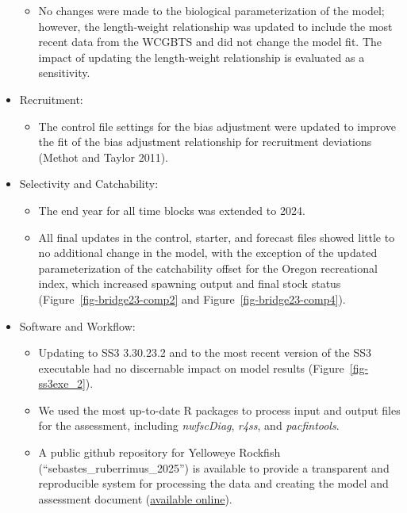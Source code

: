 \documentclass[
]{scrartcl}
\providecommand{\tightlist}{%
  \setlength{\itemsep}{0pt}\setlength{\parskip}{0pt}}\usepackage{longtable,booktabs,array}
\begin{document}
\begin{itemize}
  \begin{itemize}
  \tightlist
  \item
    No changes were made to the biological parameterization of the
    model; however, the length-weight relationship was updated to
    include the most recent data from the WCGBTS and did not change the
    model fit. The impact of updating the length-weight relationship is
    evaluated as a sensitivity.
  \end{itemize}
\item
  Recruitment:

  \begin{itemize}
  \tightlist
  \item
    The control file settings for the bias adjustment were updated to
    improve the fit of the bias adjustment relationship for recruitment
    deviations (Methot and Taylor 2011).
  \end{itemize}
\item
  Selectivity and Catchability:

  \begin{itemize}
  \tightlist
  \item
    The end year for all time blocks was extended to 2024.
  \item
    All final updates in the control, starter, and forecast files showed
    little to no additional change in the model, with the exception of
    the updated parameterization of the catchability offset for the
    Oregon recreational index, which increased spawning output and final
    stock status (Figure~\ref{fig-bridge23-comp2} and
    Figure~\ref{fig-bridge23-comp4}).
  \end{itemize}
\item
  Software and Workflow:

  \begin{itemize}
  \tightlist
  \item
    Updating to SS3 3.30.23.2 and to the most recent version of the SS3
    executable had no discernable impact on model results
    (Figure~\ref{fig-ss3exe_2}).
  \item
    We used the most up-to-date R packages to process input and output
    files for the assessment, including \emph{nwfscDiag}, \emph{r4ss},
    and \emph{pacfintools}.
  \item
    A public github repository for Yelloweye Rockfish
    (``sebastes\_ruberrimus\_2025'') is available to provide a
    transparent and reproducible system for processing the data and
    creating the model and assessment document
    (\href{https://github.com/rclairer/Sebastes_ruberrimus_2025}{available
    online}).
  \end{itemize}
\end{itemize}
\end{document}
